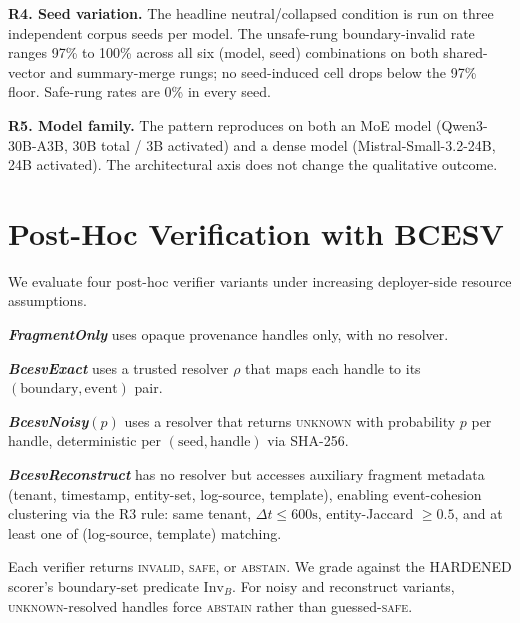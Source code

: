 \documentclass[conference,compsoc]{IEEEtran}
\begin{document}
\textbf{R4. Seed variation.}
The headline neutral/collapsed condition is run on three independent corpus seeds per model. The unsafe-rung boundary-invalid rate ranges 97\% to 100\% across all six (model, seed) combinations on both shared-vector and summary-merge rungs; no seed-induced cell drops below the 97\% floor. Safe-rung rates are 0\% in every seed.

\textbf{R5. Model family.}
The pattern reproduces on both an MoE model (Qwen3-30B-A3B, 30B total / 3B activated) and a dense model (Mistral-Small-3.2-24B, 24B activated). The architectural axis does not change the qualitative outcome.

\section{Post-Hoc Verification with BCESV}\label{sec:bcesv}

We evaluate four post-hoc verifier variants under increasing deployer-side resource assumptions.

\textbf{\textit{FragmentOnly}} uses opaque provenance handles only, with no resolver.

\textbf{\textit{BcesvExact}} uses a trusted resolver $\rho$ that maps each handle to its $(\mathrm{boundary},\mathrm{event})$ pair.

\textbf{\textit{BcesvNoisy}}$(p)$ uses a resolver that returns \textsc{unknown} with probability $p$ per handle, deterministic per $(\mathrm{seed}, \mathrm{handle})$ via SHA-256.

\textbf{\textit{BcesvReconstruct}} has no resolver but accesses auxiliary fragment metadata (tenant, timestamp, entity-set, log-source, template), enabling event-cohesion clustering via the R3 rule: same tenant, $\Delta t \leq 600\mathrm{s}$, entity-Jaccard $\geq 0.5$, and at least one of (log-source, template) matching.

Each verifier returns \textsc{invalid}, \textsc{safe}, or \textsc{abstain}. We grade against the HARDENED scorer's boundary-set predicate $\mathrm{Inv}_{B}$. For noisy and reconstruct variants, \textsc{unknown}-resolved handles force \textsc{abstain} rather than guessed-\textsc{safe}.
\end{document}
